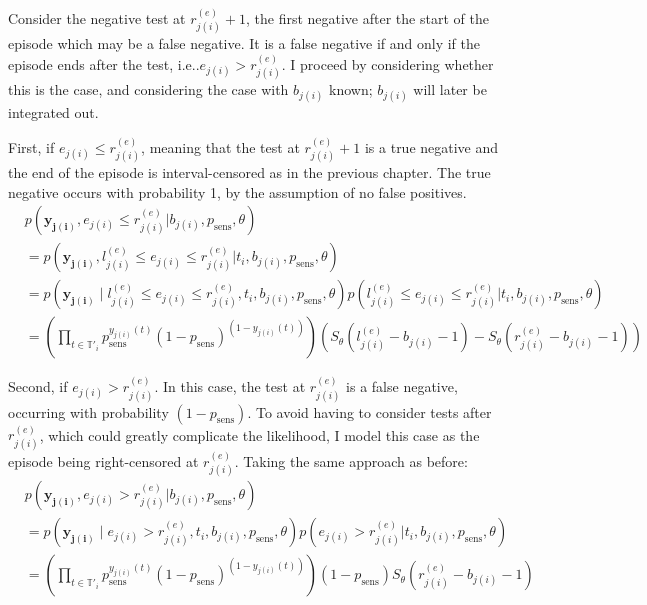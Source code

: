 \documentclass[12pt, letterpaper]{article} %
\makeatletter
\DeclareRobustCommand\onedot{\futurelet\@let@token\@onedot}
\def\@onedot{\ifx\@let@token.\else.\null\fi\xspace}
\def\ie{i.e\onedot} \def\Ie{\emph{I.e}\onedot}
\renewcommand{\vec}{\bm}
\newcommand{\sched}{\mathbb{T}}
\makeatother
\begin{document}
Consider the negative test at $r_{j(i)}^{(e)}+1$, the first negative after the start of the episode which may be a false negative.
It is a false negative if and only if the episode ends after the test, \ie $e_{j(i)} > r_{j(i)}^{(e)}$.
I proceed by considering whether this is the case, and considering the case with $b_{j(i)}$ known; $b_{j(i)}$ will later be integrated out.

First, if $e_{j(i)} \leq r_{j(i)}^{(e)}$, meaning that the test at $r_{j(i)}^{(e)}+1$ is a true negative and the end of the episode is interval-censored as in the previous chapter.
The true negative occurs with probability 1, by the assumption of no false positives.
\begin{align}
&p(\vec{y_{j(i)}}, e_{j(i)} \leq r_{j(i)}^{(e)} | b_{j(i)}, p_\text{sens}, \theta) \\
&= p(\vec{y_{j(i)}}, l_{j(i)}^{(e)} \leq e_{j(i)} \leq r_{j(i)}^{(e)} | t_i, b_{j(i)}, p_\text{sens}, \theta) \\ %
&= p(\vec{y_{j(i)}} \mid l_{j(i)}^{(e)} \leq e_{j(i)} \leq r_{j(i)}^{(e)}, t_i, b_{j(i)}, p_\text{sens}, \theta) p(l_{j(i)}^{(e)} \leq e_{j(i)} \leq r_{j(i)}^{(e)} | t_i, b_{j(i)}, p_\text{sens}, \theta) \\
&= \left( \prod_{t \in \sched'_i} p_\text{sens}^{y_{j(i)}(t)} (1 - p_\text{sens})^{(1 - y_{j(i)}(t))} \right) \left( S_\theta(l_{j(i)}^{(e)} - b_{j(i)} - 1) - S_\theta(r_{j(i)}^{(e)} - b_{j(i)} - 1) \right)
\label{imperf-test:eq:ll-ei-lt-ri}
\end{align}

Second, if $e_{j(i)} > r_{j(i)}^{(e)}$.
In this case, the test at $r_{j(i)}^{(e)}$ is a false negative, occurring with probability $(1 - p_\text{sens})$.
To avoid having to consider tests after $r_{j(i)}^{(e)}$, which could greatly complicate the likelihood, I model this case as the episode being right-censored at $r_{j(i)}^{(e)}$.
Taking the same approach as before:
\begin{align}
&p(\vec{y_{j(i)}}, e_{j(i)} > r_{j(i)}^{(e)} | b_{j(i)}, p_\text{sens}, \theta) \\
&= p(\vec{y_{j(i)}} \mid e_{j(i)} > r_{j(i)}^{(e)}, t_i, b_{j(i)}, p_\text{sens}, \theta) p(e_{j(i)} > r_{j(i)}^{(e)} | t_i, b_{j(i)}, p_\text{sens}, \theta) \\
&= \left( \prod_{t \in \sched'_i} p_\text{sens}^{y_{j(i)}(t)} (1 - p_\text{sens})^{(1 - y_{j(i)}(t))} \right) (1 - p_\text{sens}) S_\theta(r_{j(i)}^{(e)} - b_{j(i)} - 1)
\label{imperf-test:eq:ll-ei-gt-ri}
\end{align}
\end{document}
